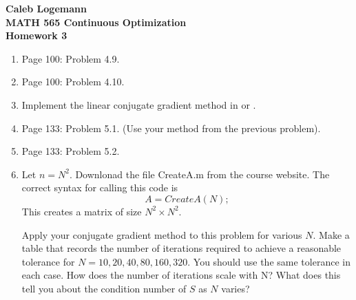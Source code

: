 \documentclass[11pt, oneside]{article}
\begin{document}
\noindent \textbf{\Large{Caleb Logemann \\
MATH 565 Continuous Optimization \\
Homework 3
}}

%
\begin{enumerate}
  \item %
    Page 100: Problem 4.9. \\

  \item %
    Page 100: Problem 4.10. \\

  \item %
    Implement the linear conjugate gradient method in \MATLAB or \PYTHON.

  \item %
    Page 133: Problem 5.1. (Use your method from the previous problem).

  \item %
    Page 133: Problem 5.2.

  \item %
    Let $n = N^2$.
    Downlonad the \MATLAB file CreateA.m from the course website.
    The correct syntax for calling this code is
    \[
      A = CreateA(N);
    \]
    This creates a matrix of size $N^2 \times N^2$.

    Apply your conjugate gradient method to this problem for various $N$.
    Make a table that records the number of iterations required to achieve a
    reasonable tolerance for $N = 10, 20, 40, 80, 160, 320$.
    You should use the same tolerance in each case.
    How does the number of iterations scale with N?
    What does this tell you about the condition number of $S$ as $N$ varies?
\end{enumerate}
\end{document}
